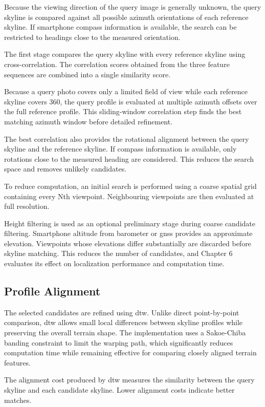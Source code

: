 Because the viewing direction of the query image is generally unknown, the query skyline is compared against all possible azimuth orientations of each reference skyline. If smartphone compass information is available, the search can be restricted to headings close to the measured orientation.

The first stage compares the query skyline with every reference skyline using cross-correlation. The correlation scores obtained from the three feature sequences are combined into a single similarity score.

Because a query photo covers only a limited field of view while each reference skyline covers 360\textdegree, the query profile is evaluated at multiple azimuth offsets over the full reference profile. This sliding-window correlation step finds the best matching azimuth window before detailed refinement.

The best correlation also provides the rotational alignment between the query skyline and the reference skyline. If compass information is available, only rotations close to the measured heading are considered. This reduces the search space and removes unlikely candidates.

To reduce computation, an initial search is performed using a coarse spatial grid containing every Nth viewpoint. Neighbouring viewpoints are then evaluated at full resolution.

Height filtering is used as an optional preliminary stage during coarse candidate filtering. Smartphone altitude from barometer or \gls{gnss} provides an approximate elevation. Viewpoints whose elevations differ substantially are discarded before skyline matching. This reduces the number of candidates, and Chapter 6 evaluates its effect on localization performance and computation time.

\subsection{Profile Alignment}

The selected candidates are refined using \gls{dtw}. Unlike direct point-by-point comparison, \gls{dtw} allows small local differences between skyline profiles while preserving the overall terrain shape. The implementation uses a Sakoe-Chiba banding constraint \cite{sakoe1978dtw} to limit the warping path, which significantly reduces computation time while remaining effective for comparing closely aligned terrain features.

The alignment cost produced by \gls{dtw} measures the similarity between the query skyline and each candidate skyline. Lower alignment costs indicate better matches.

